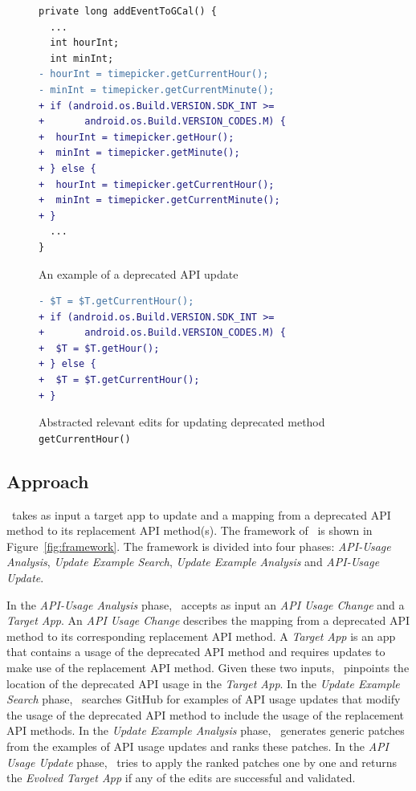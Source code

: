 \begin{figure}[htb]
\centering
\begin{lstlisting}[language=diff,numbers=none]
private long addEventToGCal() {
  ...
  int hourInt;
  int minInt;
- hourInt = timepicker.getCurrentHour();
- minInt = timepicker.getCurrentMinute();
+ if (android.os.Build.VERSION.SDK_INT >= 
+       android.os.Build.VERSION_CODES.M) {
+  hourInt = timepicker.getHour();
+  minInt = timepicker.getMinute();
+ } else {
+  hourInt = timepicker.getCurrentHour();
+  minInt = timepicker.getCurrentMinute();
+ }
  ...
}
\end{lstlisting}
\caption{An example of a deprecated API update}
\label{fig:deprecated_api_update_example}
\end{figure}

\begin{figure}[htb]
\centering
\begin{lstlisting}[language=diff,numbers=none]
- $T = $T.getCurrentHour();
+ if (android.os.Build.VERSION.SDK_INT >= 
+       android.os.Build.VERSION_CODES.M) {
+  $T = $T.getHour();
+ } else {
+  $T = $T.getCurrentHour();
+ }
\end{lstlisting}
\caption{Abstracted relevant edits for updating deprecated method \texttt{getCurrentHour()}}
\label{fig:deprecated_api_update_edits}
\end{figure}

\subsection{Approach}
\toolname\ takes as input a target app to update and a mapping from a deprecated API method to its replacement API method(s). The framework of \toolname\ is shown in Figure~\ref{fig:framework}. The framework is divided into four phases: {\em API-Usage Analysis}, {\em Update Example Search}, {\em Update Example Analysis} and {\em API-Usage Update}. 

In the {\em API-Usage Analysis} phase, \toolname\ accepts as input an {\em API Usage Change} and a {\em Target App}. An {\em API Usage Change} describes the mapping from a deprecated API method to its corresponding replacement API method. A {\em Target App} is an app that contains a usage of the deprecated API method  and requires updates to make use of the replacement API method. Given these two inputs, \toolname\ pinpoints the location of the deprecated API usage in the {\em Target App}. In the {\em Update Example Search} phase, \toolname\ searches GitHub for examples of API usage updates that modify the usage of the deprecated API method to include the usage of the replacement API methods. In the {\em Update Example Analysis} phase, \toolname\ generates generic patches from the examples of API usage updates and ranks these patches. In the {\em API Usage Update} phase, \toolname\ tries to apply the ranked patches one by one and returns the {\em Evolved Target App} if any of the edits are successful and validated.


